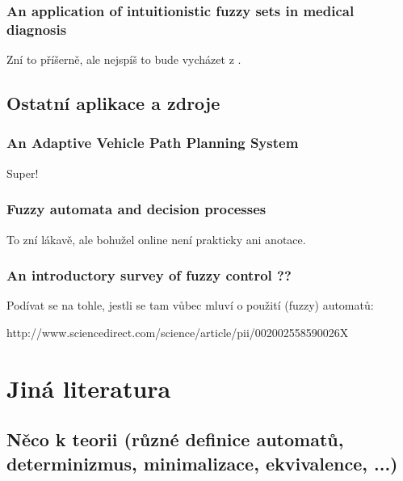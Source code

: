 \documentclass[a4paper,10pt]{article}
\begin{document}
\subsubsection*{An application of intuitionistic fuzzy sets in medical diagnosis \cite{SupBisAkh-AppIntFuzzSetMedDiag}}

Zní to příšerně, ale nejspíš to bude vycházet z \cite{GupSar-FuzzAutDecProc}.


\subsection{Ostatní aplikace a zdroje}

\subsubsection*{An Adaptive Vehicle Path Planning System \cite{HuaHuWanCheTas-AdaVehPathPlanSys}}
Super!

\subsubsection*{Fuzzy automata and decision processes\cite{GupSar-FuzzAutDecProc}}

To zní lákavě, ale bohužel online není prakticky ani anotace.


\subsubsection*{An introductory survey of fuzzy control ??}

Podívat se na tohle, jestli se tam vůbec mluví o použití (fuzzy) automatů:

http://www.sciencedirect.com/science/article/pii/002002558590026X





\section{Jiná literatura}


\subsection{Něco k teorii (různé definice automatů, determinizmus, minimalizace, ekvivalence, ...)}
\end{document}
